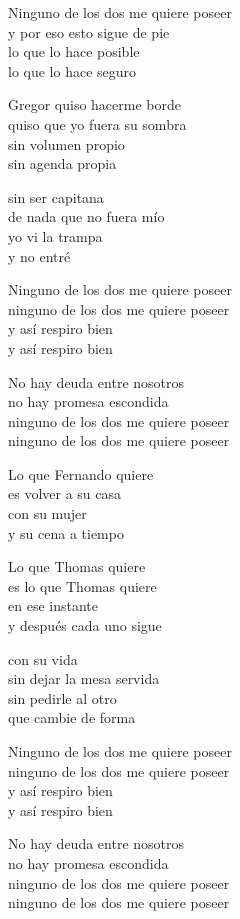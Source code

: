 \begin{lyrics}
Ninguno de los dos me quiere poseer\\
y por eso esto sigue de pie\\
lo que lo hace posible\\
lo que lo hace seguro

Gregor quiso hacerme borde\\
quiso que yo fuera su sombra\\
sin volumen propio\\
sin agenda propia

sin ser capitana\\
de nada que no fuera mío\\
yo vi la trampa\\
y no entré

Ninguno de los dos me quiere poseer\\
ninguno de los dos me quiere poseer\\
y así respiro bien\\
y así respiro bien

No hay deuda entre nosotros\\
no hay promesa escondida\\
ninguno de los dos me quiere poseer\\
ninguno de los dos me quiere poseer

Lo que Fernando quiere\\
es volver a su casa\\
con su mujer\\
y su cena a tiempo

Lo que Thomas quiere\\
es lo que Thomas quiere\\
en ese instante\\
y después cada uno sigue

con su vida\\
sin dejar la mesa servida\\
sin pedirle al otro\\
que cambie de forma

Ninguno de los dos me quiere poseer\\
ninguno de los dos me quiere poseer\\
y así respiro bien\\
y así respiro bien

No hay deuda entre nosotros\\
no hay promesa escondida\\
ninguno de los dos me quiere poseer\\
ninguno de los dos me quiere poseer


\end{lyrics}
